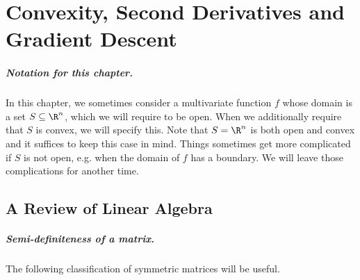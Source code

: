\chapter{Convexity, Second Derivatives and
  Gradient Descent}
\label{sec:gd}


%
\sloppy

%
%



\paragraph{Notation for this chapter.}
  In this chapter, we sometimes consider a multivariate function $f$
  whose domain is a set $S \subseteq \R^n$, which we will require to
  be open.
  When we additionally require that $S$ is convex, we will specify this.
  Note that $S = \R^n$ is both open and convex and it suffices to keep
  this case in mind.
  Things sometimes get more complicated if $S$ is not open, e.g. when the
  domain of $f$ has a boundary.
  We will leave those complications for another time.

\section{A Review of Linear Algebra}
\paragraph{Semi-definiteness of a matrix.}  The following classification of symmetric matrices will be useful.

